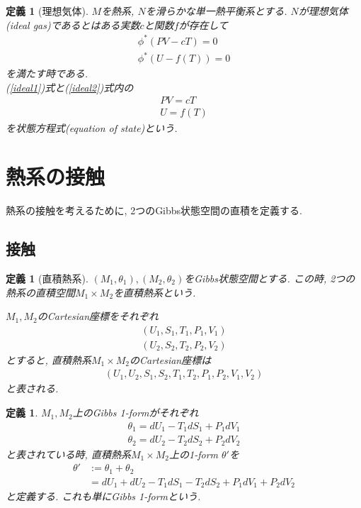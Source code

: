 \documentclass[a4paper,12pt]{ltjsarticle}
\theoremstyle{break}
\newtheorem{defn}[thm]{定義}
\newtheorem{lem}[thm]{補題}
\newcommand{\ti}{\times}
\numberwithin{equation}{section}
\begin{document}
\begin{defn}[理想気体]
  $M$を熱系, $N$を滑らかな単一熱平衡系とする. 
  $N$が理想気体(ideal gas)であるとはある実数$c$と関数$f$が存在して
  \begin{align}
    \label{ideal1}
    \phi^*(PV-cT)
    = 0 \\
    \label{ideal2}
    \phi^*(U-f(T))
    = 0
  \end{align}
  を満たす時である. \\
  (\ref{ideal1})式と(\ref{ideal2})式内の
  \begin{align*}
    PV 
    = cT \\
    U
    = f(T)
  \end{align*}
  を状態方程式(equation of state)という. 
\end{defn}


\newpage

\section{熱系の接触}

熱系の接触を考えるために, 2つのGibbs状態空間の直積を定義する. 

\subsection{接触}

\begin{defn}[直積熱系]
  $(M_1,\theta_1), (M_2,\theta_2)$をGibbs状態空間とする. 
  この時, 2つの熱系の直積空間$M_1 \ti M_2$を直積熱系という.

  $M_1,M_2$のCartesian座標をそれぞれ
  \begin{align*}
    (U_1,S_1,T_1,P_1,V_1) \\
    (U_2,S_2,T_2,P_2,V_2)
  \end{align*}
  とすると, 直積熱系$M_1 \ti M_2$のCartesian座標は
  \begin{align*}
    (U_1,U_2,S_1,S_2,T_1,T_2,P_1,P_2,V_1,V_2)
  \end{align*}
  と表される. 
\end{defn} 

\begin{defn}
  $M_1,M_2$上のGibbs 1-formがそれぞれ
  \begin{align*}
    \theta_1
    = dU_1 - T_1dS_1 + P_1dV_1 \\
    \theta_2
    = dU_2 - T_2dS_2 + P_2dV_2
  \end{align*}
  と表されている時, 直積熱系$M_1 \ti M_2$上の1-form $\theta'$を
  \begin{align*}
    \theta'
    &:= \theta_1 + \theta_2 \\
    &= dU_1 + dU_2 - T_1dS_1 - T_2dS_2 + P_1dV_1 + P_2dV_2
  \end{align*}
  と定義する. 
  これも単にGibbs 1-formという. 
\end{defn}
  
\end{document}
